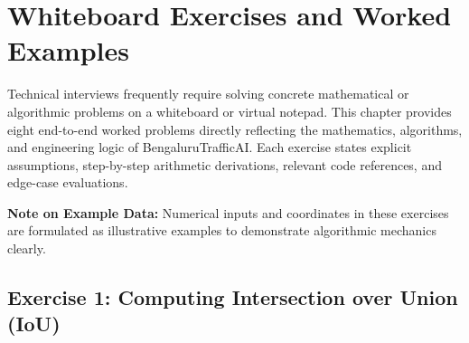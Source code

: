 \chapter{Whiteboard Exercises and Worked Examples}
\label{ch:whiteboard_exercises}

Technical interviews frequently require solving concrete mathematical or algorithmic problems on a whiteboard or virtual notepad. This chapter provides eight end-to-end worked problems directly reflecting the mathematics, algorithms, and engineering logic of BengaluruTrafficAI. Each exercise states explicit assumptions, step-by-step arithmetic derivations, relevant code references, and edge-case evaluations.

\begin{alertnote}
\textbf{Note on Example Data:} Numerical inputs and coordinates in these exercises are formulated as illustrative examples to demonstrate algorithmic mechanics clearly.
\end{alertnote}

\section{Exercise 1: Computing Intersection over Union (IoU)}
\label{sec:wb_iou}

